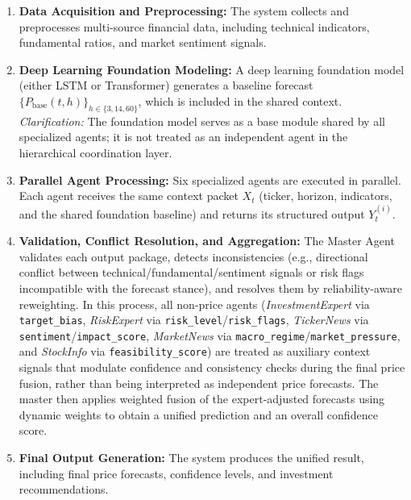 \documentclass{ieeeaccess}
\begin{document}
\begin{enumerate}
    \item \textbf{Data Acquisition and Preprocessing:} 
    The system collects and preprocesses multi-source financial data, including technical indicators, fundamental ratios, and market sentiment signals.
    
    \item \textbf{Deep Learning Foundation Modeling:} 
    A deep learning foundation model (either LSTM or Transformer) generates a baseline forecast $\{P_{\text{base}}(t,h)\}_{h\in\{3,14,60\}}$, which is included in the shared context.
    \textit{Clarification:} The foundation model serves as a base module shared by all specialized agents; it is not treated as an independent agent in the hierarchical coordination layer.
    
    \item \textbf{Parallel Agent Processing:} 
    Six specialized agents are executed in parallel. Each agent receives the same context packet $X_t$ (ticker, horizon, indicators, and the shared foundation baseline) and returns its structured output $Y_t^{(i)}$.
    
    \item \textbf{Validation, Conflict Resolution, and Aggregation:} 
    The Master Agent validates each output package, detects inconsistencies (e.g., directional conflict between technical/fundamental/sentiment signals or risk flags incompatible with the forecast stance), and resolves them by reliability-aware reweighting. In this process, all non-price agents (\textit{InvestmentExpert} via \texttt{target\_bias}, \textit{RiskExpert} via \texttt{risk\_level}/\texttt{risk\_flags}, \textit{TickerNews} via \texttt{sentiment}/\texttt{impact\_score}, \textit{MarketNews} via \texttt{macro\_regime}/\texttt{market\_pressure}, and \textit{StockInfo} via \texttt{feasibility\_score}) are treated as auxiliary context signals that modulate confidence and consistency checks during the final price fusion, rather than being interpreted as independent price forecasts. The master then applies weighted fusion of the expert-adjusted forecasts using dynamic weights to obtain a unified prediction and an overall confidence score.
    
    \item \textbf{Final Output Generation:} 
    The system produces the unified result, including final price forecasts, confidence levels, and investment recommendations.
\end{enumerate}
\end{document}

